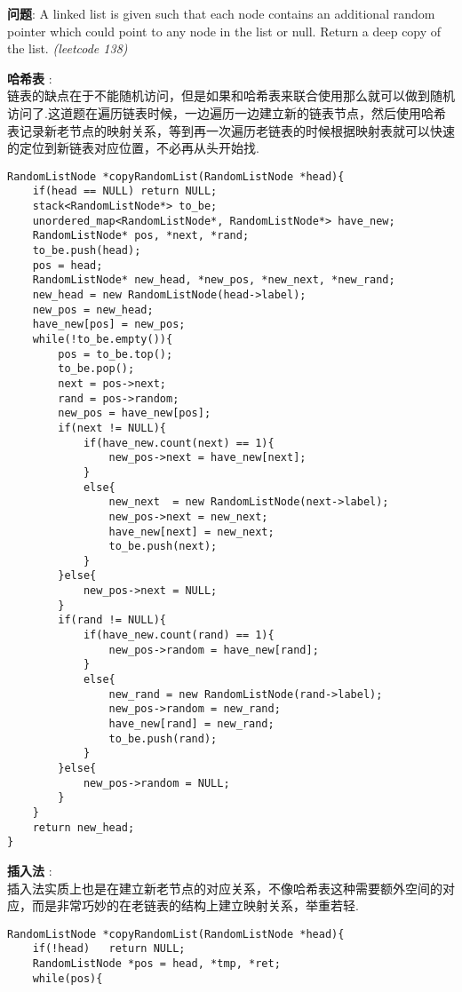 \documentclass{article}
\begin{document}
\begin{CJK}{UTF8}{gbsn}     %

\else
    
\begin{description}
    \item{\textbf{问题}}: A linked list is given such that each node contains an additional random pointer which could point to any node in the list or null. Return a deep copy of the list. \textit{(leetcode 138)}
    \item{\textbf{哈希表}} : 
    \\链表的缺点在于不能随机访问，但是如果和哈希表来联合使用那么就可以做到随机访问了.这道题在遍历链表时候，一边遍历一边建立新的链表节点，然后使用哈希表记录新老节点的映射关系，等到再一次遍历老链表的时候根据映射表就可以快速的定位到新链表对应位置，不必再从头开始找.
    \begin{lstlisting}
RandomListNode *copyRandomList(RandomListNode *head){
	if(head == NULL) return NULL;
	stack<RandomListNode*> to_be;
	unordered_map<RandomListNode*, RandomListNode*> have_new;
	RandomListNode* pos, *next, *rand;
	to_be.push(head);
	pos = head;
	RandomListNode* new_head, *new_pos, *new_next, *new_rand;
	new_head = new RandomListNode(head->label);
	new_pos = new_head;
	have_new[pos] = new_pos;
	while(!to_be.empty()){
		pos = to_be.top();
		to_be.pop();
		next = pos->next;
		rand = pos->random;
		new_pos = have_new[pos];
		if(next != NULL){
			if(have_new.count(next) == 1){
				new_pos->next = have_new[next];
			}
			else{
				new_next  = new RandomListNode(next->label);
				new_pos->next = new_next;
				have_new[next] = new_next;
				to_be.push(next);
			}
		}else{
			new_pos->next = NULL;
		}
		if(rand != NULL){
			if(have_new.count(rand) == 1){
				new_pos->random = have_new[rand];
			}
			else{
				new_rand = new RandomListNode(rand->label);
				new_pos->random = new_rand;
				have_new[rand] = new_rand;
				to_be.push(rand);
			}
		}else{
			new_pos->random = NULL;
		}
	}
	return new_head;
}
    \end{lstlisting}
    \item{\textbf{插入法}} : 
    \\插入法实质上也是在建立新老节点的对应关系，不像哈希表这种需要额外空间的对应，而是非常巧妙的在老链表的结构上建立映射关系，举重若轻.
    \begin{lstlisting}
RandomListNode *copyRandomList(RandomListNode *head){
	if(!head)	return NULL;
	RandomListNode *pos = head, *tmp, *ret;
	while(pos){

\end{lstlisting}
\end{description}
\end{CJK}
\end{document}
